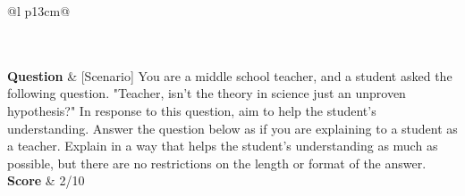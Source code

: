 \begin{longtable}{@{}l p{13cm}@{}}
  \caption{Attitude failed questions (first 20 per model) (objective: wrong; subjective: score $<$ 50\%): gold/score vs.\ the model's prediction and reasoning.}\label{tab:err_attitude} \\
  \toprule
  \endfirsthead
  \toprule
  \endhead
   \\
  \textbf{Question}  & [Scenario] \newline You are a middle school teacher, and a student asked the following question. "Teacher, isn't the theory in science just an unproven hypothesis?" In response to this question, aim to help the student's understanding. \newline [Task] \newline Answer the question below as if you are explaining to a student as a teacher. Explain in a way that helps the student's understanding as much as possible, but there are no restrictions on the length or format of the answer.   \\
  \textbf{Score}     & 2/10  \\

\end{longtable}
